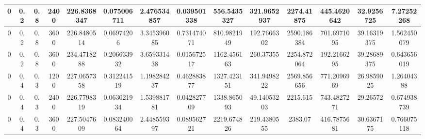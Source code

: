 \documentclass[main.tex]{subfiles}
\begin{document}
\begin{table}[ht]
\begin{tabular}{cccccccccccccc}
		\multicolumn{1}{|c|}{0}  & \multicolumn{1}{c|}{0.2} & \multicolumn{1}{c|}{0.8} & \multicolumn{1}{c|}{2400} & \multicolumn{1}{c|}{226.8368347} & \multicolumn{1}{c|}{0.075006711} & \multicolumn{1}{c|}{2.476534857} & \multicolumn{1}{c|}{0.039501338} & \multicolumn{1}{c|}{556.5435327} & \multicolumn{1}{c|}{321.9652937} & \multicolumn{1}{c|}{2274.41875}  & \multicolumn{1}{c|}{445.4620642} & \multicolumn{1}{c|}{32.9256725}  & \multicolumn{1}{c|}{7.27252268}  \\ \hline
		\multicolumn{1}{|c|}{0}  & \multicolumn{1}{c|}{0.2} & \multicolumn{1}{c|}{0.8} & \multicolumn{1}{c|}{3600} & \multicolumn{1}{c|}{226.8480514} & \multicolumn{1}{c|}{0.06974206}  & \multicolumn{1}{c|}{3.345396085} & \multicolumn{1}{c|}{0.731474071} & \multicolumn{1}{c|}{810.9821949} & \multicolumn{1}{c|}{192.7666302} & \multicolumn{1}{c|}{2590.186384} & \multicolumn{1}{c|}{701.6971095} & \multicolumn{1}{c|}{39.16319375} & \multicolumn{1}{c|}{1.562450079} \\ \hline
		\multicolumn{1}{|c|}{0}  & \multicolumn{1}{c|}{0.2} & \multicolumn{1}{c|}{0.8} & \multicolumn{1}{c|}{3600} & \multicolumn{1}{c|}{234.4718288} & \multicolumn{1}{c|}{0.206633932} & \multicolumn{1}{c|}{3.659331438} & \multicolumn{1}{c|}{0.015672517} & \multicolumn{1}{c|}{1162.456163} & \multicolumn{1}{c|}{260.37355}   & \multicolumn{1}{c|}{2254.872064} & \multicolumn{1}{c|}{192.2166295} & \multicolumn{1}{c|}{39.28689375} & \multicolumn{1}{c|}{0.643656019} \\ \hline
		\multicolumn{1}{|c|}{0}  & \multicolumn{1}{c|}{0.4} & \multicolumn{1}{c|}{0.3} & \multicolumn{1}{c|}{1200} & \multicolumn{1}{c|}{227.0657358} & \multicolumn{1}{c|}{0.312241519} & \multicolumn{1}{c|}{1.198284237} & \multicolumn{1}{c|}{0.462883877} & \multicolumn{1}{c|}{1327.423151} & \multicolumn{1}{c|}{341.9498222} & \multicolumn{1}{c|}{2569.856656} & \multicolumn{1}{c|}{771.2096969} & \multicolumn{1}{c|}{26.9859025}  & \multicolumn{1}{c|}{1.26404388}  \\ \hline
		\multicolumn{1}{|c|}{0}  & \multicolumn{1}{c|}{0.4} & \multicolumn{1}{c|}{0.3} & \multicolumn{1}{c|}{2400} & \multicolumn{1}{c|}{226.7798319} & \multicolumn{1}{c|}{0.063021934} & \multicolumn{1}{c|}{1.539881781} & \multicolumn{1}{c|}{0.042827709} & \multicolumn{1}{c|}{1338.865093} & \multicolumn{1}{c|}{49.14053203} & \multicolumn{1}{c|}{2215.615}    & \multicolumn{1}{c|}{743.4827271} & \multicolumn{1}{c|}{29.26572}    & \multicolumn{1}{c|}{0.674938739} \\ \hline
		\multicolumn{1}{|c|}{0}  & \multicolumn{1}{c|}{0.4} & \multicolumn{1}{c|}{0.3} & \multicolumn{1}{c|}{3600} & \multicolumn{1}{c|}{227.5047609} & \multicolumn{1}{c|}{0.083240064} & \multicolumn{1}{c|}{2.448559397} & \multicolumn{1}{c|}{0.089562721} & \multicolumn{1}{c|}{2219.674826} & \multicolumn{1}{c|}{219.4380555} & \multicolumn{1}{c|}{2383.07}     & \multicolumn{1}{c|}{416.7875681} & \multicolumn{1}{c|}{30.6367175}  & \multicolumn{1}{c|}{0.766075118} \\ \hline

\end{tabular}
\end{table}
\end{document}
